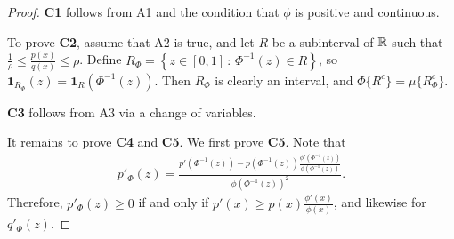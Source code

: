 \documentclass{article}
\begin{document}
\begin{proof}

\textbf{C1} follows from A1 and the condition that $\phi$ is positive and continuous.

To prove \textbf{C2}, assume that A2 is true, and let $R$ be a subinterval of ${\mathbb R}$ such that $\frac{1}{\rho} \leq \frac{p(x)}{q(x)} \leq \rho$. Define $R_{\Phi} = \left\{ z \in [0,1] \,:\, \Phi^{-1}(z) \in R \right\}$, so $\mathbf{1}_{R_\Phi}(z) = \mathbf{1}_R(\Phi^{-1}(z))$. Then $R_{\Phi}$ is clearly an interval, and $\Phi\{ R^c \} = \mu\{ R_{\Phi}^c \}$.
 
\textbf{C3} follows from A3 via a change of variables. 

It remains to prove \textbf{C4} and \textbf{C5}. We first prove \textbf{C5}. Note that 
\begin{align*}
p'_\Phi(z) = \frac{ p'(\Phi^{-1}(z))  - 
                     p(\Phi^{-1}(z)) \frac{\phi'(\Phi^{-1}(z))}{\phi(\Phi^{-1}(z))} }
           { \phi(\Phi^{-1}(z))^2}.
\end{align*}
Therefore, $p'_\Phi(z) \geq 0$ if and only if $p'(x) \geq p(x) \frac{\phi'(x)}{\phi(x)}$, and likewise for $q'_\Phi(z)$.


\end{proof}
\end{document}
